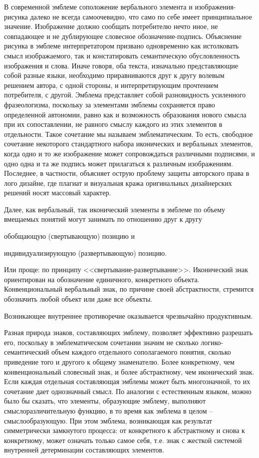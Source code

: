 В современной эмблеме соположение вербального элемента и изображения-рисунка далеко не всегда
самоочевидно, что само по себе имеет принципиальное значение. Изображение должно сообщать
потребителю нечто иное, не совпадающее и не дублирующее словесное обозначение-подпись. Объяснение
рисунка в эмблеме интерпретатором призвано одновременно как истолковать смысл изображаемого, так и
констатировать семантическую обусловленность изображения и слова. Иначе говоря, оба текста,
изначально представляющие собой разные языки, необходимо приравниваются друг к другу волевым
решением автора, с одной стороны, и интерпретирующим прочтением потребителя, с другой. Эмблема
представляет собой разновидность усиленного фразеологизма,  поскольку за элементами эмблемы
сохраняется право определенной автономии, равно как и возможность образования нового смысла при их
сопоставлении, не равного смыслу каждого из этих элементов в отдельности. Такое сочетание мы
называем эмблематическим. То есть, свободное сочетание некоторого стандартного набора иконических
и вербальных элементов, когда одно и то же изображение может сопровождаться различными подписями, и
одно одна и та же подпись может прилагаться к различным изображениям. Последнее, в частности,
объясняет острую проблему защиты авторского права в лого дизайне, где плагиат и визуальная кража
оригинальных дизайнерских решений носят массовый характер.

Далее, как вербальный, так иконический элементы в эмблеме по объему вмещаемых понятий могут занимать
по отношению друг к другу
\begin{enumerate*}[label=\asbuk*)]
\item обобщающую (свертывающую) позицию и
\item индивидуализирующую (развертывающую) позицию.
\end{enumerate*}
Или проще: по принципу <<свертывание-развертывание>>.  Иконический знак
ориентирован на обозначение единичного, конкретного объекта. Конвенциональный вербальный знак, по
причине своей абстрактности, стремится обозначить любой объект или даже все объекты.

Возникающее внутреннее противоречие оказывается чрезвычайно продуктивным.

Разная природа знаков, составляющих эмблему, позволяет эффективно разрешать его, поскольку в
эмблематическом сочетании значим не сколько логико-семантический объем каждого отдельного
сополагаемого понятия, сколько приведение того и другого к общему знаменателю. Более конкретному,
чем конвенциональный словесный знак, и более абстрактному, чем иконический знак. Если каждая
отдельная составляющая эмблемы может быть многозначной, то их сочетание дает однозначный смысл. По
аналогии с естественным языком, можно было бы сказать, что элементы, образующие эмблему, выполняют
смыслоразличительную функцию, в то время как эмблема в целом -- смыслообразующую. При этом эмблема,
возникающая как результат симметрически замкнутого процесса: от конкретного к абстрактному и снова к
конкретному, может означать только самое себя, т.е. знак с жесткой системой внутренней детерминации
составляющих элементов.

